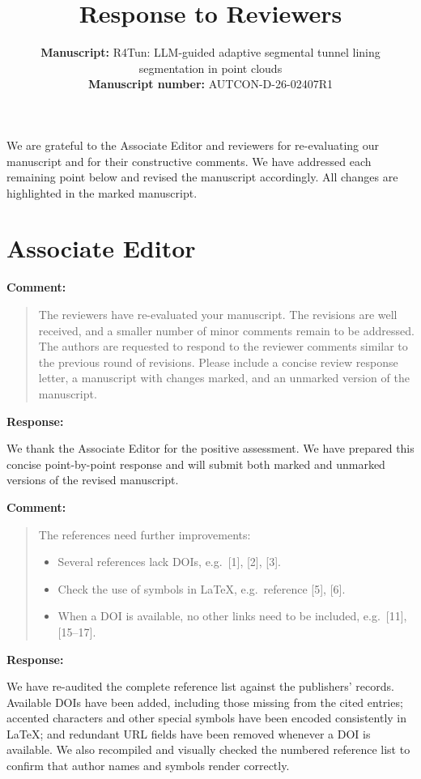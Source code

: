 \documentclass[11pt,a4paper]{article}
\title{Response to Reviewers}
\author{%
  \parbox{\textwidth}{%
    \textbf{Manuscript:} R4Tun: LLM-guided adaptive segmental tunnel lining segmentation in point clouds\\[0.4em]
    \textbf{Manuscript number:} AUTCON-D-26-02407R1
  }%
}
\date{}
\newenvironment{commentblock}{%
  \par\smallskip\noindent\textbf{Comment:}\par
  \begin{quote}\itshape\color{black}
}{%
  \end{quote}\smallskip
}
\newenvironment{responseblock}{%
  \par\smallskip\noindent\textbf{Response:}\par
  \begingroup\color{responsegreen}
}{%
  \endgroup\smallskip
}
\begin{document}
\maketitle

We are grateful to the Associate Editor and reviewers for re-evaluating our manuscript and for their constructive comments. We have addressed each remaining point below and revised the manuscript accordingly. All changes are highlighted in the marked manuscript.

\section*{Associate Editor}

\begin{commentblock}
The reviewers have re-evaluated your manuscript. The revisions are well received, and a smaller number of minor comments remain to be addressed. The authors are requested to respond to the reviewer comments similar to the previous round of revisions. Please include a concise review response letter, a manuscript with changes marked, and an unmarked version of the manuscript.
\end{commentblock}
\begin{responseblock}
We thank the Associate Editor for the positive assessment. We have prepared this concise point-by-point response and will submit both marked and unmarked versions of the revised manuscript.
\end{responseblock}

\begin{commentblock}
The references need further improvements:
\begin{itemize}[nosep]
  \item Several references lack DOIs, e.g.\ [1], [2], [3].
  \item Check the use of symbols in \LaTeX, e.g.\ reference [5], [6].
  \item When a DOI is available, no other links need to be included, e.g.\ [11], [15--17].
\end{itemize}
\end{commentblock}
\begin{responseblock}
We have re-audited the complete reference list against the publishers' records. Available DOIs have been added, including those missing from the cited entries; accented characters and other special symbols have been encoded consistently in \LaTeX; and redundant URL fields have been removed whenever a DOI is available. We also recompiled and visually checked the numbered reference list to confirm that author names and symbols render correctly.
\end{responseblock}
\end{document}
